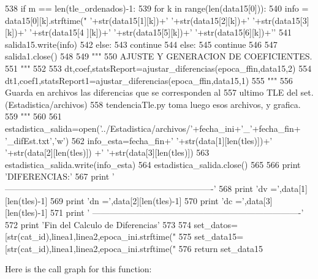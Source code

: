 \begin{DoxyCode}
538                 if m == len(tle_ordenados)-1:
539                     for k in range(len(data15[0])):
540                         info = data15[0][k].strftime("%
      '+str(data15[1][k])+' '+str(data15[2][k])+' '+str(data15[3][k])+' '+str(data15[4
      ][k])+' '+str(data15[5][k])+' '+str(data15[6][k])+'\n'
541                         salida15.write(info)
542             else:
543                 continue 
544         else:
545             continue  
546         
547     salida1.close()
548     
549     """
550     AJUSTE Y GENERACION DE COEFICIENTES.
551     """
552     
553     dt,coef,statsReport=ajustar_diferencias(epoca_ffin,data15,2)
554     dt1,coef1,statsReport1=ajustar_diferencias(epoca_ffin,data15,1)
555     """
556     Guarda en archivos las diferencias que se corresponden al
557     ultimo TLE del set. (Estadistica/archivos)
558     tendenciaTle.py toma luego esos archivos, y grafica.
559     """
560 
561     estadistica_salida=open('../Estadistica/archivos/'+fecha_ini+'_'+fecha_fin+
      '_difEst.txt','w')
562     info_esta=fecha_fin+' '+str(data[1][len(tles)])+' '+str(data[2][len(tles)])
      +' '+str(data[3][len(tles)])
563     estadistica_salida.write(info_esta)
564     estadistica_salida.close()
565     
566     print 'DIFERENCIAS:'
567     print '
      -------------------------------------------------------------------------'
568     print 'dv =',data[1][len(tles)-1]
569     print 'dn =',data[2][len(tles)-1]
570     print 'dc =',data[3][len(tles)-1]
571     print '
      -------------------------------------------------------------------------'
572     print 'Fin del Calculo de Diferencias'
573 
574     set_datos=[str(cat_id),linea1,linea2,epoca_ini.strftime("%
575     set_data15=[str(cat_id),linea1,linea2,epoca_ini.strftime("%
576     return set_data15

\end{DoxyCode}


\-Here is the call graph for this function\-:


